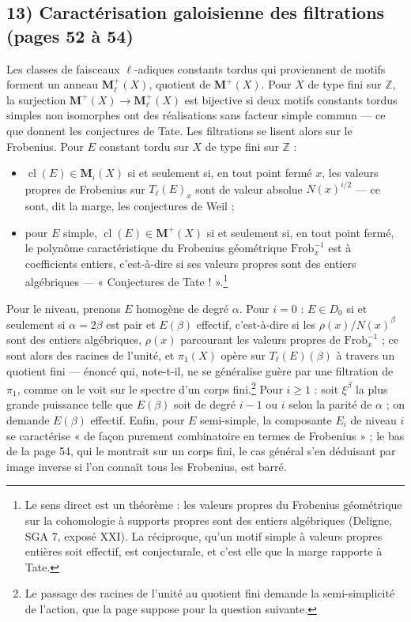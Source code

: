 \documentclass[11pt,a4paper]{article}
\begin{document}
\subsection*{13) Caractérisation galoisienne des filtrations (pages 52 à 54)}

Les classes de faisceaux $\ell$-adiques constants tordus qui proviennent de
motifs forment un anneau $\mathbf{M}^{+}_{\ell}(X)$, quotient de
$\mathbf{M}^{+}(X)$. Pour $X$ de type fini sur $\mathbb{Z}$, la surjection
$\mathbf{M}^{+}(X) \to \mathbf{M}^{+}_{\ell}(X)$ est bijective si deux motifs
constants tordus simples non isomorphes ont des réalisations sans facteur
simple commun --- ce que donnent les conjectures de Tate. Les filtrations se
lisent alors sur le Frobenius. Pour $E$ constant tordu sur $X$ de type fini
sur $\mathbb{Z}$ :
\begin{itemize}
  \item $\operatorname{cl}(E) \in \mathbf{M}_{i}(X)$ si et seulement si, en tout
  point fermé $x$, les valeurs propres de Frobenius sur $T_{\ell}(E)_{x}$ sont de
  valeur absolue $N(x)^{i/2}$ --- ce sont, dit la marge, les conjectures de
  Weil ;
  \item pour $E$ simple, $\operatorname{cl}(E) \in \mathbf{M}^{+}(X)$ si et
  seulement si, en tout point fermé, le polynôme caractéristique du Frobenius
  géométrique $\mathrm{Frob}_{x}^{-1}$ est à coefficients entiers, c'est-à-dire
  si ses valeurs propres sont des entiers algébriques --- « Conjectures de
  Tate ! ».\footnote{Le sens direct est un théorème : les valeurs propres du
  Frobenius géométrique sur la cohomologie à supports propres sont des entiers
  algébriques (Deligne, SGA 7, exposé XXI). La réciproque, qu'un motif simple à
  valeurs propres entières soit effectif, est conjecturale, et c'est elle que la
  marge rapporte à Tate.}
\end{itemize}
Pour le niveau, prenons $E$ homogène de degré $\alpha$. Pour $i = 0$ : $E \in
D_{0}$ si et seulement si $\alpha = 2\beta$ est pair et $E(\beta)$ effectif,
c'est-à-dire si les $\rho(x)/N(x)^{\beta}$ sont des entiers algébriques, $\rho(x)$
parcourant les valeurs propres de $\mathrm{Frob}_{x}^{-1}$ ; ce sont alors des
racines de l'unité, et $\pi_{1}(X)$ opère sur $T_{\ell}(E)(\beta)$ à travers un
quotient fini --- énoncé qui, note-t-il, ne se généralise guère par une
filtration de $\pi_{1}$, comme on le voit sur le spectre d'un corps
fini.\footnote{Le passage des racines de l'unité au quotient fini demande la
semi-simplicité de l'action, que la page suppose pour la question suivante.}
Pour $i \geqslant 1$ : soit $\xi^{\beta}$ la plus grande puissance telle que
$E(\beta)$ soit de degré $i-1$ ou $i$ selon la parité de $\alpha$ ; on demande
$E(\beta)$ effectif. Enfin, pour $E$ semi-simple, la composante $E_{i}$ de niveau
$i$ se caractérise « de façon purement combinatoire en termes de Frobenius » ; le
bas de la page 54, qui le montrait sur un corps fini, le cas général s'en
déduisant par image inverse si l'on connaît tous les Frobenius, est barré.
\end{document}
